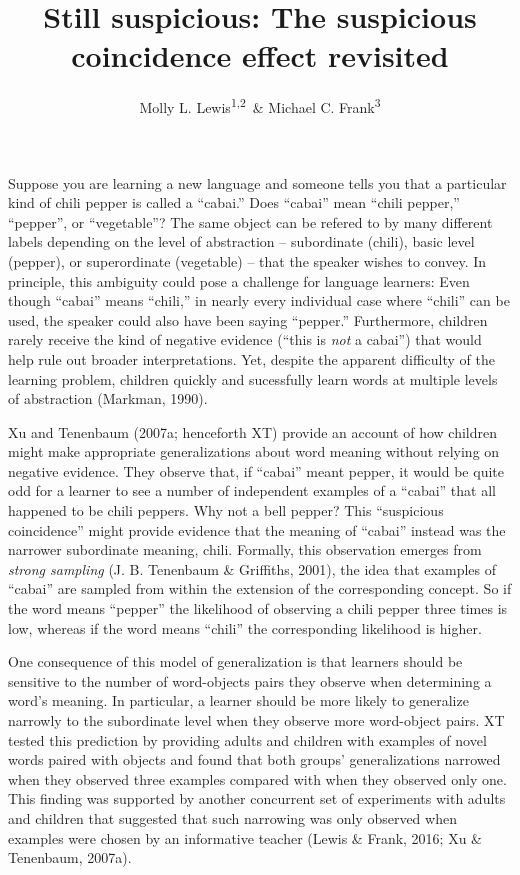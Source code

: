 \documentclass[english,floatsintext,man]{apa6}
\title{Still suspicious: The suspicious coincidence effect revisited}
\author{Molly L. Lewis\textsuperscript{1,2}~\& Michael C. Frank\textsuperscript{3}}
\affiliation{
    \vspace{0.5cm}
          \textsuperscript{1} Computation Institute, University of Chicago\\
          \textsuperscript{2} Department of Psychology, University of Wisconsin, Madison\\
          \textsuperscript{3} Department of Psychology, Stanford University  }
\theoremstyle{definition}
\theoremstyle{definition}
\theoremstyle{remark}
\begin{document}
\maketitle

\setcounter{secnumdepth}{0}



Suppose you are learning a new language and someone tells you that a
particular kind of chili pepper is called a \enquote{cabai.} Does
\enquote{cabai} mean \enquote{chili pepper,} \enquote{pepper}, or
\enquote{vegetable}? The same object can be refered to by many different
labels depending on the level of abstraction -- subordinate (chili),
basic level (pepper), or superordinate (vegetable) -- that the speaker
wishes to convey. In principle, this ambiguity could pose a challenge
for language learners: Even though \enquote{cabai} means
\enquote{chili,} in nearly every individual case where \enquote{chili}
can be used, the speaker could also have been saying \enquote{pepper.}
Furthermore, children rarely receive the kind of negative evidence
(\enquote{this is \emph{not} a cabai}) that would help rule out broader
interpretations. Yet, despite the apparent difficulty of the learning
problem, children quickly and sucessfully learn words at multiple levels
of abstraction (Markman, 1990).

Xu and Tenenbaum (2007a; henceforth XT) provide an account of how
children might make appropriate generalizations about word meaning
without relying on negative evidence. They observe that, if
\enquote{cabai} meant pepper, it would be quite odd for a learner to see
a number of independent examples of a \enquote{cabai} that all happened
to be chili peppers. Why not a bell pepper? This \enquote{suspicious
coincidence} might provide evidence that the meaning of \enquote{cabai}
instead was the narrower subordinate meaning, chili. Formally, this
observation emerges from \emph{strong sampling} (J. B. Tenenbaum \&
Griffiths, 2001), the idea that examples of \enquote{cabai} are sampled
from within the extension of the corresponding concept. So if the word
means \enquote{pepper} the likelihood of observing a chili pepper three
times is low, whereas if the word means \enquote{chili} the
corresponding likelihood is higher.

One consequence of this model of generalization is that learners should
be sensitive to the number of word-objects pairs they observe when
determining a word's meaning. In particular, a learner should be more
likely to generalize narrowly to the subordinate level when they observe
more word-object pairs. XT tested this prediction by providing adults
and children with examples of novel words paired with objects and found
that both groups' generalizations narrowed when they observed three
examples compared with when they observed only one. This finding was
supported by another concurrent set of experiments with adults and
children that suggested that such narrowing was only observed when
examples were chosen by an informative teacher (Lewis \& Frank, 2016; Xu
\& Tenenbaum, 2007a).
\end{document}

